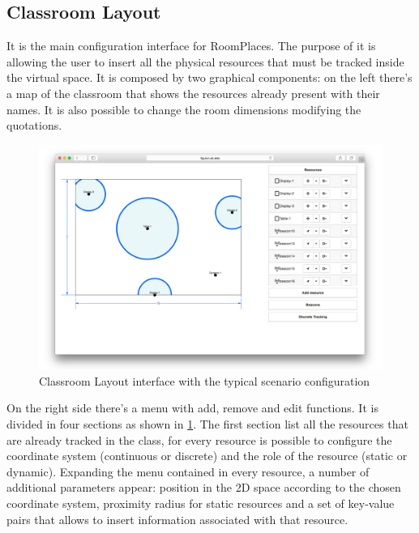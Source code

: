 \subsection{Classroom Layout}
It is the main configuration interface for RoomPlaces. The purpose of it is allowing the user to insert all the physical resources that must be tracked inside the virtual space. It is composed by two graphical components: on the left there's a map of the classroom that shows the resources already present with their names. It is also possible to change the room dimensions modifying the quotations.

\begin{figure}
\centering
\includegraphics[width=6in]{images/classroom-layout-map.png}
\caption{Classroom Layout interface with the typical scenario configuration}
\label{fig:classroom_layout_map}
\end{figure}

On the right side there's a menu with add, remove and edit functions. It is divided in four sections as shown in \ref{fig:classroom_layout_map}. The first section list all the resources that are already tracked in the class, for every resource is possible to configure the coordinate system (continuous or discrete) and the role of the resource (static or dynamic). Expanding the menu contained in every resource, a number of additional parameters appear: position in the 2D space according to the chosen coordinate system, proximity radius for static resources and a set of key-value pairs that allows to insert information associated with that resource.

